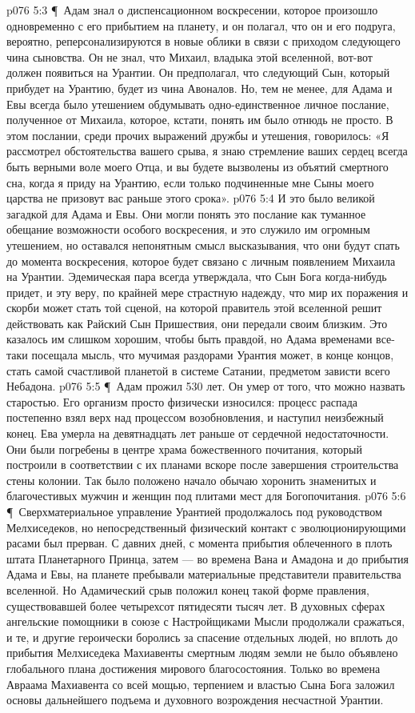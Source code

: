 \vs p076 5:3 \P\ Адам знал о диспенсационном воскресении, которое произошло одновременно с его прибытием на планету, и он полагал, что он и его подруга, вероятно, реперсонализируются в новые облики в связи с приходом следующего чина сыновства. Он не знал, что Михаил, владыка этой вселенной, вот\hyp{}вот должен появиться на Урантии. Он предполагал, что следующий Сын, который прибудет на Урантию, будет из чина Авоналов. Но, тем не менее, для Адама и Евы всегда было утешением обдумывать одно\hyp{}единственное личное послание, полученное от Михаила, которое, кстати, понять им было отнюдь не просто. В этом послании, среди прочих выражений дружбы и утешения, говорилось: «Я рассмотрел обстоятельства вашего срыва, я знаю стремление ваших сердец всегда быть верными воле моего Отца, и вы будете вызволены из объятий смертного сна, когда я приду на Урантию, если только подчиненные мне Сыны моего царства не призовут вас раньше этого срока».
\vs p076 5:4 И это было великой загадкой для Адама и Евы. Они могли понять это послание как туманное обещание возможности особого воскресения, и это служило им огромным утешением, но оставался непонятным смысл высказывания, что они будут спать до момента воскресения, которое будет связано с личным появлением Михаила на Урантии. Эдемическая пара всегда утверждала, что Сын Бога когда\hyp{}нибудь придет, и эту веру, по крайней мере страстную надежду, что мир их поражения и скорби может стать той сценой, на которой правитель этой вселенной решит действовать как Райский Сын Пришествия, они передали своим близким. Это казалось им слишком хорошим, чтобы быть правдой, но Адама временами все\hyp{}таки посещала мысль, что мучимая раздорами Урантия может, в конце концов, стать самой счастливой планетой в системе Сатании, предметом зависти всего Небадона.
\vs p076 5:5 \P\ Адам прожил 530 лет. Он умер от того, что можно назвать старостью. Его организм просто физически износился: процесс распада постепенно взял верх над процессом возобновления, и наступил неизбежный конец. Ева умерла на девятнадцать лет раньше от сердечной недостаточности. Они были погребены в центре храма божественного почитания, который построили в соответствии с их планами вскоре после завершения строительства стены колонии. Так было положено начало обычаю хоронить знаменитых и благочестивых мужчин и женщин под плитами мест для Богопочитания.
\vs p076 5:6 \P\ Сверхматериальное управление Урантией продолжалось под руководством Мелхиседеков, но непосредственный физический контакт с эволюционирующими расами был прерван. С давних дней, с момента прибытия облеченного в плоть штата Планетарного Принца, затем --- во времена Вана и Амадона и до прибытия Адама и Евы, на планете пребывали материальные представители правительства вселенной. Но Адамический срыв положил конец такой форме правления, существовавшей более четырехсот пятидесяти тысяч лет. В духовных сферах ангельские помощники в союзе с Настройщиками Мысли продолжали сражаться, и те, и другие героически боролись за спасение отдельных людей, но вплоть до прибытия Мелхиседека Махиавенты смертным людям земли не было объявлено глобального плана достижения мирового благосостояния. Только во времена Авраама Махиавента со всей мощью, терпением и властью Сына Бога заложил основы дальнейшего подъема и духовного возрождения несчастной Урантии.
